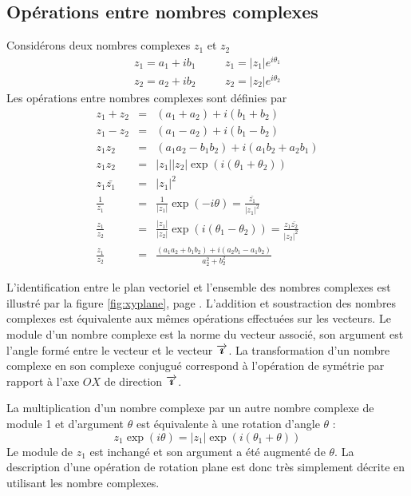 \subsection{Opérations entre nombres complexes}
Considérons deux nombres complexes $z_1$ et $z_2$
\begin{eqnarray}
z_1 = a_1 + i b_1 & \quad & z_1 = |z_1| e^{i\theta_1} \nonumber\\
z_2 = a_2 + i b_2 & \quad & z_2 = |z_2| e^{i\theta_2} \nonumber
\end{eqnarray}
Les opérations entre nombres complexes sont définies par
\begin{eqnarray}
z_1 + z_2 & = & (a_1 + a_2) + i (b_1 + b_2) \\
z_1 - z_2 & = & (a_1 - a_2) + i (b_1 - b_2) \\
z_1 z_2 & = & (a_1 a_2 - b_1 b_2) + i (a_1 b_2 + a_2 b_1) \\
z_1 z_2 & = & |z_1||z_2| \exp(i(\theta_1 + \theta_2)) \\
z_1 \bar{z_1} & = & |z_1|^2 \\
\frac{1}{z_1} & = & \frac{1}{|z_1|} \exp(-i\theta) = \frac{\bar{z_1}}{|z_1|^2} \\
\frac{z_1}{z_2} & = & \frac{|z_1|}{|z_2|} \exp(i(\theta_1 - \theta_2)) = \frac{z_1 \bar{z_2}}{|z_2|^2} \\
\frac{z_1}{z_2} & = & \frac{(a_1 a_2 + b_1 b_2) + i(a_2 b_1 - a_1 b_2)}{a_2^2 + b_2^2}
\end{eqnarray}

L'identification entre le plan vectoriel et l'ensemble des nombres complexes
est illustré par la figure \ref{fig:xyplane}, page \pageref{fig:xyplane}.
L'addition et soustraction des nombres complexes est équivalente aux mêmes
opérations effectuées sur les vecteurs. Le module d'un nombre complexe est la norme
du vecteur associé, son argument est l'angle formé entre le vecteur et le vecteur
$\overrightarrow{\boldsymbol{\imath}}$. La transformation d'un nombre complexe en son complexe conjugué correspond
à l'opération de symétrie par rapport à l'axe $OX$ de direction $\overrightarrow{\boldsymbol{\imath}}$.

La multiplication d'un nombre complexe par un autre nombre complexe de module 1
et d'argument $\theta$ est équivalente à une rotation d'angle $\theta$ :
\begin{equation}
z_1 \exp(i\theta) = |z_1| \exp(i(\theta_1 + \theta))
\end{equation}
Le module de $z_1$ est inchangé et son argument a été augmenté de $\theta$.
La description d'une opération de rotation plane est donc très simplement
décrite en utilisant les nombre complexes.

